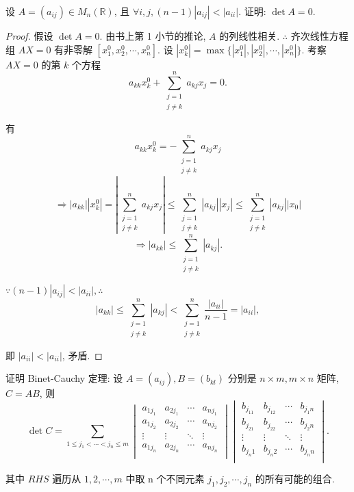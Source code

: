 \documentclass{ctexart}
\begin{document}
\begin{exercise}%
    设 $A=(a_{ij})\in M_n(\mathbb{R})$, 且 $\forall i,j,(n-1)|a_{ij}|<|a_{ii}|$. 证明: $\det A=0$.
\end{exercise}
\begin{proof}
    假设 $\det A=0$. 由书上第 1 小节的推论, $A$ 的列线性相关. $\therefore$ 齐次线性方程组 $AX=0$ 有非零解 $[x^0_1,x^0_2,\cdots,x^0_n]$. 设 $|x^0_k|=\max\{|x^0_1|,|x^0_2|,\cdots,|x^0_n|\}$. 考察 $AX=0$ 的第 $k$ 个方程
    \[a_{kk}x^0_k+\sum_{\substack{j=1\\j\neq k}}^na_{kj}x_j=0.\]

    有
    \[a_{kk}x^0_k=-\sum_{\substack{j=1\\j\neq k}}^na_{kj}x_j\]
    \[\Rightarrow|a_{kk}||x^0_k|=\left|\sum_{\substack{j=1\\j\neq k}}^na_{kj}x_j\right|\leq\sum_{\substack{j=1\\j\neq k}}^n|a_{kj}||x_j|\leq\sum_{\substack{j=1\\j\neq k}}^n|a_{kj}||x_0|\]
    \[\Rightarrow|a_{kk}|\leq\sum_{\substack{j=1\\j\neq k}}^n|a_{kj}|.\]

    $\because(n-1)|a_{ij}|<|a_{ii}|,\therefore$
    \[|a_{kk}|\leq\sum_{\substack{j=1\\j\neq k}}^n|a_{kj}|<\sum_{\substack{j=1\\j\neq k}}^n\dfrac{|a_{ii}|}{n-1}=|a_{ii}|,\]

    即 $|a_{ii}|<|a_{ii}|$, 矛盾.
\end{proof}
\begin{exercise}\label{ex3.6}
    证明 Binet-Cauchy 定理: 设 $A=(a_{ij}),B=(b_{kl})$ 分别是 $n\times m,m\times n$ 矩阵, $C=AB$, 则
    \[\det C=\sum\limits_{1\leq j_1<\cdots<j_n\leq m}\begin{vmatrix}
        a_{1j_1} & a_{2j_1} & \cdots & a_{nj_1} \\
        a_{1j_2} & a_{2j_2} & \cdots & a_{nj_2} \\
        \vdots & \vdots & \ddots & \vdots \\
        a_{1j_n} & a_{2j_n} & \cdots & a_{nj_n} \\
    \end{vmatrix}\begin{vmatrix}
        b_{j_11} & b_{j_12} & \cdots & b_{j_1n} \\
        b_{j_21} & b_{j_22} & \cdots & b_{j_2n} \\
        \vdots & \vdots & \ddots & \vdots \\
        b_{j_n1} & b_{j_n2} & \cdots & b_{j_nn} \\
    \end{vmatrix}.\]

    其中 $RHS$ 遍历从 $1,2,\cdots,m$ 中取 n 个不同元素 $j_1,j_2,\cdots,j_n$ 的所有可能的组合.
\end{exercise}
\end{document}
